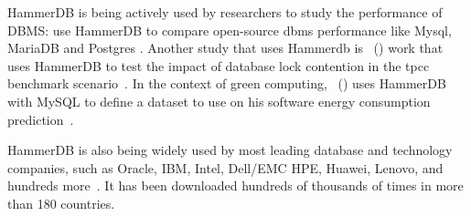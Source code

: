 



HammerDB is being actively used by researchers to study the performance of DBMS: \citeauthor{elgrablyanalise} use HammerDB to compare open-source \gls{dbms} performance like Mysql, MariaDB and Postgres \cite{elgrablyanalise}. Another study that uses Hammerdb is \citeauthor{knoche2016combining}~(\citeyear{knoche2016combining}) work that uses HammerDB to test the impact of database lock contention in the \gls{tpcc} benchmark scenario~\cite{knoche2016combining}. In the context of green computing,  \citeauthor{koccak2018software}~(\citeyear{koccak2018software}) uses HammerDB with MySQL to define a dataset to use on his software energy consumption prediction~\cite{koccak2018software}. 

HammerDB is also being widely used by most leading database and technology companies, such as Oracle, IBM, Intel, Dell/EMC HPE, Huawei, Lenovo, and hundreds more~\cite{hammerdb}. It has been downloaded hundreds of thousands of times in more than 180 countries.







